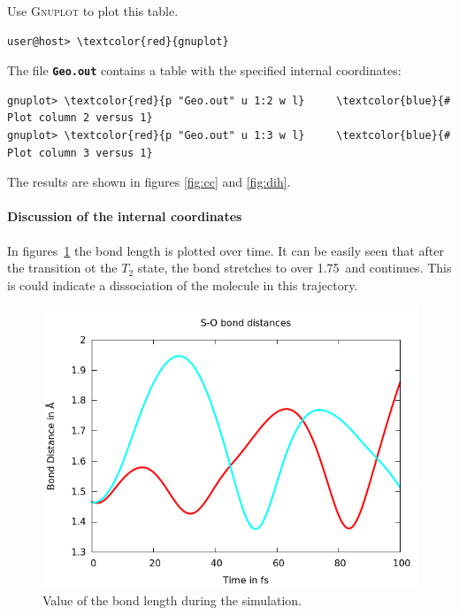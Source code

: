 \documentclass[a4paper,11pt,DIV=15,openany]{scrbook}
\newcommand{\ttt}[1]{\textbf{\texttt{#1}}}
\begin{document}
Use \textsc{Gnuplot} to plot this table. 
\begin{Verbatim}[commandchars=\\\{\}]
user@host> \textcolor{red}{gnuplot}
\end{Verbatim}
The file \ttt{Geo.out} contains a table with the specified internal coordinates:
\begin{oframed}
\footnotesize\begin{Verbatim}[commandchars=\\\{\}]
gnuplot> \textcolor{red}{p "Geo.out" u 1:2 w l}     \textcolor{blue}{# Plot column 2 versus 1}
gnuplot> \textcolor{red}{p "Geo.out" u 1:3 w l}     \textcolor{blue}{# Plot column 3 versus 1}
\end{Verbatim}
\end{oframed}

\normalsize
The results are shown in figures \ref{fig:cc} and \ref{fig:dih}.

\paragraph{Discussion of the internal coordinates} 

In figures~\ref{fig:so} the  bond length is plotted over time. It can be easily seen that after the transition ot the $T_2$ state, the bond stretches to over 1.75~\angstrom and continues.
This is could indicate a dissociation of the molecule in this trajectory.

\begin{figure}[htb]
  \centering
  \includegraphics[width=\textwidth]{figures/SO.png}
  \caption{Value of the  bond length during the simulation.}
  \label{fig:so}
\end{figure}
\end{document}
